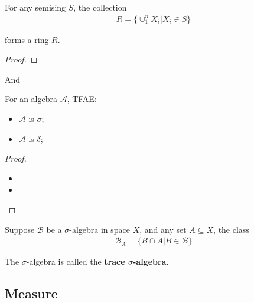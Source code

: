 \documentclass[Total.tex]{subfiles}
\begin{document}
					\begin{proposition}
						For any semising $S$, 
						the collection
						\begin{gather*}
							R=\{\cup_1^n X_i|X_i\in S\}
						\end{gather*}
						
						forms a ring $R$.
					\end{proposition}
					\begin{proof}
					\end{proof}
					
					And
					\begin{proposition}
						For an algebra $\mathcal{A}$, TFAE:
						\begin{itemize}
							\item $\mathcal{A}$ is $\sigma$;
							\item $\mathcal{A}$ is $\delta$;
						\end{itemize}
					\end{proposition}
					\begin{proof}
						\begin{itemize}
							\item 
							\item 
						\end{itemize}
					\end{proof}
					
					\begin{Def}
						Suppose $\mathscr{B}$ be a $\sigma$-algebra in space $X$, and any set $A\subseteq X$, the class 
						\begin{gather*}
							\mathscr{B}_A=\{B\cap A|B\in \mathscr{B}\}
						\end{gather*}
						
						The $\sigma$-algebra is called the \textbf{trace $\sigma$-algebra}.
					\end{Def}
			\subsection{Measure}
\end{document}
